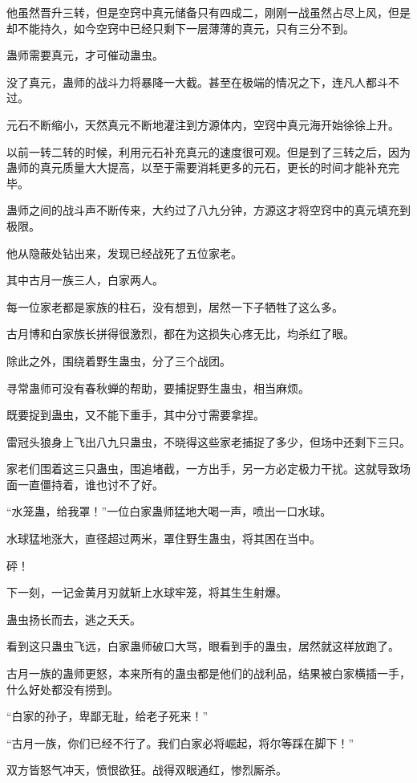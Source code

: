 \begin{this_body}
他虽然晋升三转，但是空窍中真元储备只有四成二，刚刚一战虽然占尽上风，但是却不能持久，如今空窍中已经只剩下一层薄薄的真元，只有三分不到。

蛊师需要真元，才可催动蛊虫。

没了真元，蛊师的战斗力将暴降一大截。甚至在极端的情况之下，连凡人都斗不过。

元石不断缩小，天然真元不断地灌注到方源体内，空窍中真元海开始徐徐上升。

以前一转二转的时候，利用元石补充真元的速度很可观。但是到了三转之后，因为蛊师的真元质量大大提高，以至于需要消耗更多的元石，更长的时间才能补充完毕。

蛊师之间的战斗声不断传来，大约过了八九分钟，方源这才将空窍中的真元填充到极限。

他从隐蔽处钻出来，发现已经战死了五位家老。

其中古月一族三人，白家两人。

每一位家老都是家族的柱石，没有想到，居然一下子牺牲了这么多。

古月博和白家族长拼得很激烈，都在为这损失心疼无比，均杀红了眼。

除此之外，围绕着野生蛊虫，分了三个战团。

寻常蛊师可没有春秋蝉的帮助，要捕捉野生蛊虫，相当麻烦。

既要捉到蛊虫，又不能下重手，其中分寸需要拿捏。

雷冠头狼身上飞出八九只蛊虫，不晓得这些家老捕捉了多少，但场中还剩下三只。

家老们围着这三只蛊虫，围追堵截，一方出手，另一方必定极力干扰。这就导致场面一直僵持着，谁也讨不了好。

“水笼蛊，给我罩！”一位白家蛊师猛地大喝一声，喷出一口水球。

水球猛地涨大，直径超过两米，罩住野生蛊虫，将其困在当中。

砰！

下一刻，一记金黄月刃就斩上水球牢笼，将其生生射爆。

蛊虫扬长而去，逃之夭夭。

看到这只蛊虫飞远，白家蛊师破口大骂，眼看到手的蛊虫，居然就这样放跑了。

古月一族的蛊师更怒，本来所有的蛊虫都是他们的战利品，结果被白家横插一手，什么好处都没有捞到。

“白家的孙子，卑鄙无耻，给老子死来！”

“古月一族，你们已经不行了。我们白家必将崛起，将尔等踩在脚下！”

双方皆怒气冲天，愤恨欲狂。战得双眼通红，惨烈厮杀。


\end{this_body}
